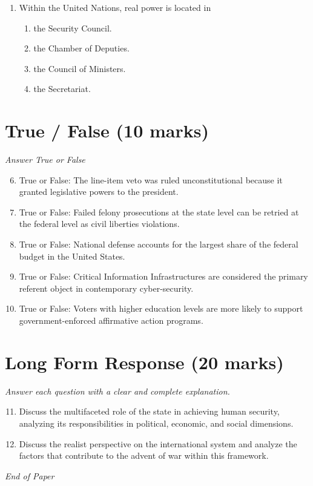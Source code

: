 \documentclass[12pt]{article}
\begin{document}
\begin{enumerate}[label=\arabic*.]
\begin{enumerate}[label=(\alph*)]
    \item Idealism
    \item Liberalism
    \item None of the above
\end{enumerate}
\item Within the United Nations, real power is located in
\begin{enumerate}[label=(\alph*)]
    \item the Security Council.
    \item the Chamber of Deputies.
    \item the Council of Ministers.
    \item the Secretariat.
\end{enumerate}
\end{enumerate}

\section*{True / False (10 marks)}
\textit{Answer True or False}
\begin{enumerate}[label=\arabic*.]
\setcounter{enumi}{5}
\item True or False: The line-item veto was ruled unconstitutional because it granted legislative powers to the president.
\item True or False: Failed felony prosecutions at the state level can be retried at the federal level as civil liberties violations.
\item True or False: National defense accounts for the largest share of the federal budget in the United States.
\item True or False: Critical Information Infrastructures are considered the primary referent object in contemporary cyber-security.
\item True or False: Voters with higher education levels are more likely to support government-enforced affirmative action programs.
\end{enumerate}

\section*{Long Form Response (20 marks)}
\textit{Answer each question with a clear and complete explanation.}
\begin{enumerate}[label=\arabic*.]
\setcounter{enumi}{10}
\item Discuss the multifaceted role of the state in achieving human security, analyzing its responsibilities in political, economic, and social dimensions.
\item Discuss the realist perspective on the international system and analyze the factors that contribute to the advent of war within this framework.
\end{enumerate}

\vfill
\noindent\textit{End of Paper}
\end{document}
